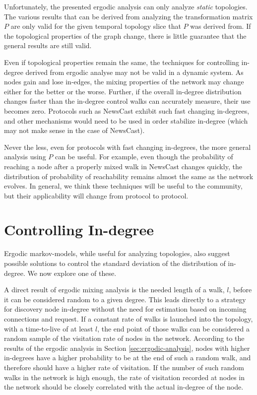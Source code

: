 \documentclass[a4paper,11pt,twocolumn]{article}
\begin{document}
Unfortunately, the presented ergodic analysis can only analyze \emph{static}
topologies.  The various results that can be derived from analyzing the
transformation matrix $P$ are only valid for the given temporal topology slice
that $P$ was derived from.  If the topological properties of the graph change,
there is little guarantee that the general results are still valid.

Even if topological properties remain the same, the techniques for controlling
in-degree derived from ergodic analyse may not be valid in a dynamic system.
As nodes gain and lose in-edges, the mixing properties of the network may
change either for the better or the worse.  Further, if the overall in-degree
distribution changes faster than the in-degree control walks can accurately
measure, their use becomes zero.  Protocols such as NewsCast exhibit
such fast changing in-degrees, and other mechanisms would need to be used in
order stabilize in-degree (which may not make sense in the case of NewsCast).

Never the less, even for protocols with fast changing in-degrees, the more
general analysis using $P$ can be useful.  For example, even though the
probability of reaching a node after a properly mixed walk in NewsCast changes
quickly, the distribution of probability of reachability remains almost the
same as the network evolves.  %
In general, we think these techniques will be useful to the community, but
their applicability will change from protocol to protocol.

\section{Controlling In-degree}

Ergodic markov-models, while useful for analyzing topologies, also suggest
possible solutions to control the standard deviation of the distribution of
in-degree.  We now explore one of these.

A direct result of ergodic mixing analysis is the needed length of a walk, $l$,
before it can be considered random to a given degree.  This leads directly to a
strategy for discovery node in-degree without the need for estimation based on
incoming connections and request.  If a constant rate of walks is launched into
the topology, with a time-to-live of at least $l$, the end point of those walks
can be considered a random sample of the visitation rate of nodes in the
network.  According to the results of the ergodic analysis in Section
\ref{sec:ergodic-analysis}, nodes with higher in-degrees have a higher
probability to be at the end of such a random walk, and therefore should have a
higher rate of visitation.  If the number of such random walks in the network
is high enough, the rate of visitation recorded at nodes in the network should
be closely correlated with the actual in-degree of the node.
\end{document}
